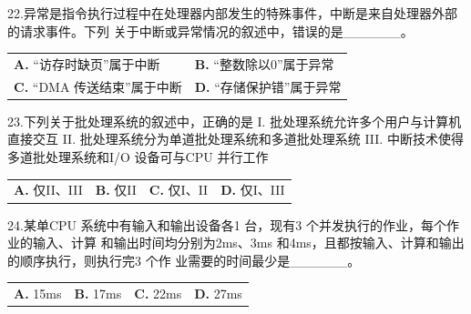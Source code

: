 \documentclass[UTF8,11pt]{ctexart}
\begin{document}
22.异常是指令执行过程中在处理器内部发生的特殊事件，中断是来自处理器外部的请求事件。下列 关于中断或异常情况的叙述中，错误的是\_\_\_\_\_\_。


\begin{center}\begin{tabular}{>{\raggedright\arraybackslash}p{\dimexpr(\linewidth-4\tabcolsep)/2\relax}>{\raggedright\arraybackslash}p{\dimexpr(\linewidth-4\tabcolsep)/2\relax}}
\textbf{A.} “访存时缺页”属于中断 & \textbf{B.} “整数除以0”属于异常\\[.35em]
\textbf{C.} “DMA 传送结束”属于中断 & \textbf{D.} “存储保护错”属于异常\\[.35em]\end{tabular}\end{center}

23.下列关于批处理系统的叙述中，正确的是 I. 批处理系统允许多个用户与计算机直接交互 II. 批处理系统分为单道批处理系统和多道批处理系统 III. 中断技术使得多道批处理系统和I/O 设备可与CPU 并行工作


\begin{center}\begin{tabular}{>{\raggedright\arraybackslash}p{\dimexpr(\linewidth-8\tabcolsep)/4\relax}>{\raggedright\arraybackslash}p{\dimexpr(\linewidth-8\tabcolsep)/4\relax}>{\raggedright\arraybackslash}p{\dimexpr(\linewidth-8\tabcolsep)/4\relax}>{\raggedright\arraybackslash}p{\dimexpr(\linewidth-8\tabcolsep)/4\relax}}
\textbf{A.} 仅II、III & \textbf{B.} 仅II & \textbf{C.} 仅I、II & \textbf{D.} 仅I、III\\[.35em]\end{tabular}\end{center}

24.某单CPU 系统中有输入和输出设备各1 台，现有3 个并发执行的作业，每个作业的输入、计算 和输出时间均分别为2ms、3ms 和4ms，且都按输入、计算和输出的顺序执行，则执行完3 个作 业需要的时间最少是\_\_\_\_\_\_。


\begin{center}\begin{tabular}{>{\raggedright\arraybackslash}p{\dimexpr(\linewidth-8\tabcolsep)/4\relax}>{\raggedright\arraybackslash}p{\dimexpr(\linewidth-8\tabcolsep)/4\relax}>{\raggedright\arraybackslash}p{\dimexpr(\linewidth-8\tabcolsep)/4\relax}>{\raggedright\arraybackslash}p{\dimexpr(\linewidth-8\tabcolsep)/4\relax}}
\textbf{A.} 15ms & \textbf{B.} 17ms & \textbf{C.} 22ms & \textbf{D.} 27ms\\[.35em]\end{tabular}\end{center}
\end{document}
